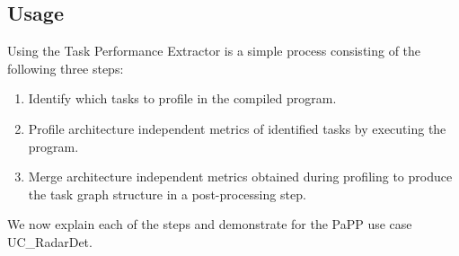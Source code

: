 \documentclass[11pt,a4paper]{article}
\begin{document}
\subsection{Usage}

Using the Task Performance Extractor is a simple process consisting of the following three steps:

\begin{enumerate}
    \item Identify which tasks to profile in the compiled program.
    \item Profile architecture independent metrics of identified tasks by executing the program.
    \item Merge architecture independent metrics obtained during profiling to produce the task graph structure in a post-processing step.
\end{enumerate}

We now explain each of the steps and demonstrate for the PaPP use case UC\_RadarDet.
\end{document}
